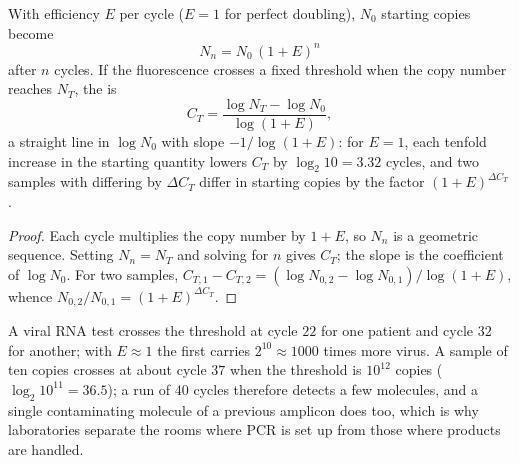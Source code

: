 \begin{theorem}\label{thm:b3:genetic-engineering:pcr}
With efficiency $E$ per cycle ($E = 1$ for perfect doubling), $N_{0}$
starting copies become
\[
N_{n} = N_{0}\,(1 + E)^{n}
\]
after $n$ cycles. If the fluorescence crosses a fixed threshold when
the copy number reaches $N_{T}$, the \emph{} is
\[
C_{T} = \frac{\log N_{T} - \log N_{0}}{\log(1 + E)},
\]
a straight line in $\log N_{0}$ with slope $-1/\log(1+E)$: for $E = 1$,
each tenfold increase in the starting quantity lowers $C_{T}$ by
$\log_{2} 10 = 3.32$ cycles, and two samples with 
differing by $\Delta C_{T}$ differ in starting copies by the factor
$(1 + E)^{\Delta C_{T}}$.
\end{theorem}
\begin{proof}
Each cycle multiplies the copy number by $1 + E$, so $N_{n}$ is a
geometric sequence. Setting $N_{n} = N_{T}$ and solving for $n$ gives
$C_{T}$; the slope is the coefficient of $\log N_{0}$. For two samples,
$C_{T,1} - C_{T,2} = (\log N_{0,2} - \log N_{0,1})/\log(1+E)$, whence
$N_{0,2}/N_{0,1} = (1+E)^{\Delta C_{T}}$.
\end{proof}

\begin{example}\label{ex:b3:genetic-engineering:qpcr}
A viral RNA test crosses the threshold at cycle $22$ for one patient
and cycle $32$ for another; with $E \approx 1$ the first carries $2^{10}
\approx 1000$ times more virus. A sample of ten copies crosses at about
cycle $37$ when the threshold is $10^{12}$ copies ($\log_{2} 10^{11} =
36.5$); a run of $40$ cycles therefore detects a few molecules, and a
single contaminating molecule of a previous amplicon does too, which is
why laboratories separate the rooms where PCR is set up from those
where products are handled.
\end{example}

